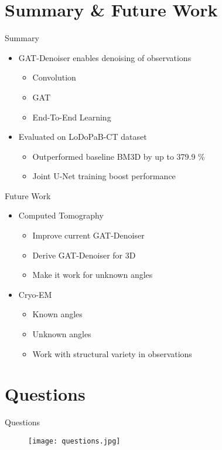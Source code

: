 

\section{Summary \& Future Work}

\begin{frame}{Summary}
  \begin{itemize}
    \item GAT-Denoiser enables denoising of observations
    \begin{itemize}
      \item Convolution
      \item GAT
      \item End-To-End Learning
    \end{itemize}
    \item<2> Evaluated on LoDoPaB-CT dataset
    \begin{itemize}
      \item Outperformed baseline BM3D by up to 379.9 \%
      \item Joint U-Net training boost performance
    \end{itemize}
  \end{itemize}
\end{frame}

\begin{frame}{Future Work}

  \begin{itemize}
    \item Computed Tomography
    \begin{itemize}
      \item Improve current GAT-Denoiser
      \item Derive GAT-Denoiser for 3D
      \item Make it work for unknown angles
    \end{itemize}
    \item<2> Cryo-EM
    \begin{itemize}
      \item Known angles
      \item Unknown angles
      \item Work with structural variety in observations
    \end{itemize}
  \end{itemize}

\end{frame}

\section{Questions}
\begin{frame}[c]{Questions}
  \begin{figure}
    \centering
    \texttt{[image: questions.jpg]}
  \end{figure}
\end{frame}

